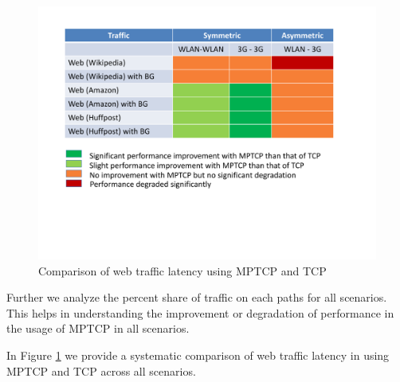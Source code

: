 \begin{figure}[!th]
\begin{minipage}[t]{0.48\textwidth}
\begin{center}
\includegraphics[width=.98\linewidth]{plots/MPTCP-Web}
\end{center}
\caption{Comparison of web traffic latency using MPTCP and TCP}
  \label{fig:web-summary}
\end{minipage}
\end{figure}

Further we analyze the percent share of traffic on each paths for all scenarios. This helps in understanding the improvement or degradation of performance
in the usage of MPTCP in all scenarios.



In Figure \ref{fig:web-summary} we provide a systematic comparison of web traffic latency in using MPTCP and TCP across all scenarios.
